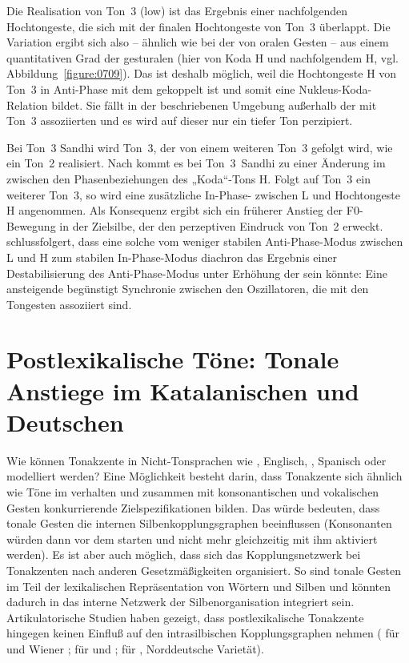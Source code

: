 Die Realisation von Ton~3 (low) ist das Ergebnis einer nachfolgenden Hochtongeste, die sich mit der finalen Hochtongeste von Ton~3 überlappt. Die Variation ergibt sich also -- ähnlich wie bei der  von oralen Gesten -- aus einem quantitativen Grad der gesturalen  (hier von Koda H und nachfolgendem  H, vgl. Abbildung~\ref{figure:0709}). Das ist deshalb möglich, weil die Hochtongeste H von Ton~3 in Anti-Phase mit dem  gekoppelt ist und somit eine Nukleus-Koda-Relation bildet. Sie fällt in der beschriebenen Umgebung außerhalb der mit Ton~3 assoziierten  und es wird auf dieser  nur ein tiefer Ton perzipiert.

\largerpage
Bei Ton~3 Sandhi wird Ton~3, der von einem weiteren Ton~3 gefolgt wird, wie ein Ton~2 realisiert. Nach \citet{Hsieh2011} kommt es bei Ton~3~Sandhi zu einer Änderung im  zwischen den Phasenbeziehungen des „Koda“-Tons H. Folgt auf Ton~3 ein weiterer Ton~3, so wird eine zusätzliche In-Phase- zwischen  L und Hochtongeste H angenommen. Als Konsequenz ergibt sich ein früherer Anstieg der F0-Bewegung in der Zielsilbe, der den perzeptiven Eindruck von Ton~2 erweckt. \citet{Hsieh2011} schlussfolgert, dass eine solche  vom weniger stabilen Anti-Phase-Modus zwischen L und H zum stabilen In-Phase-Modus diachron das Ergebnis einer Destabilisierung des Anti-Phase-Modus unter Erhöhung der  sein könnte: Eine ansteigende  begünstigt Synchronie zwischen den Oszillatoren, die mit den Tongesten assoziiert sind.

\section[Postlexikalische Töne: Tonale Anstiege (Katalanisch -- Deutsch)]{Postlexikalische Töne: Tonale Anstiege im Katalanischen und Deutschen}
\label{sec:0702}

Wie können Tonakzente in Nicht-Tonsprachen wie , Englisch, , Spanisch oder  modelliert werden? Eine Möglichkeit besteht darin, dass Tonakzente sich ähnlich wie Töne im  verhalten und zusammen mit konsonantischen und vokalischen Gesten konkurrierende Zielspezifikationen bilden. Das würde bedeuten, dass tonale Gesten die internen Silbenkopplungsgraphen beeinflussen (Konsonanten würden dann  vor dem  starten und nicht mehr gleichzeitig mit ihm aktiviert werden). Es ist aber auch möglich, dass sich das Kopplungsnetzwerk bei Tonakzenten nach anderen Gesetzmäßigkeiten organisiert. So sind tonale Gesten im  Teil der lexikalischen Repräsentation von Wörtern und Silben und könnten dadurch in das interne Netzwerk der Silbenorganisation integriert sein. Artikulatorische Studien haben gezeigt, dass postlexikalische Tonakzente hingegen keinen Einfluß auf den intrasilbischen Kopplungsgraphen nehmen (\citealt{Mücke2009b, Mücke2012} für  und Wiener ; \citealt{Niemann2011} für  und ; \citealt{Niemann2015,Niemann2017} für , Norddeutsche Varietät).

